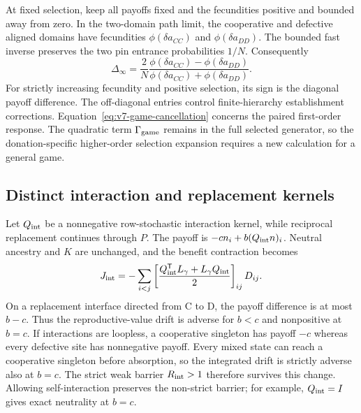 \documentclass[aps,pre,reprint,amsmath,amssymb,longbibliography]{revtex4-2}
\begin{document}
At fixed selection, keep all payoffs fixed and the fecundities
positive and bounded away from zero. In the two-domain path limit,
the cooperative and defective aligned domains have fecundities
$\phi(\delta a_{CC})$ and $\phi(\delta a_{DD})$. The bounded fast
inverse preserves the two pin entrance probabilities $1/N$.
Consequently
\begin{equation}
 \Delta_\infty=\frac2N
 \frac{\phi(\delta a_{CC})-\phi(\delta a_{DD})}
      {\phi(\delta a_{CC})+\phi(\delta a_{DD})}.
 \label{eq:v7-general-game-domain}
\end{equation}
For strictly increasing fecundity and positive selection, its sign
is the diagonal payoff difference. The off-diagonal entries control finite-hierarchy
establishment corrections. Equation~\eqref{eq:v7-game-cancellation}
concerns the paired first-order response. The quadratic term
$\Gamma_{\rm game}$ remains in the full selected generator, so the
donation-specific higher-order selection expansion requires a new
calculation for a general game.

\subsection{Distinct interaction and replacement kernels}
\label{app:v7-encounter-kernel}
Let $Q_{\rm int}$ be a nonnegative row-stochastic interaction
kernel, while reciprocal replacement continues through $P$.
The payoff is $-cn_i+b(Q_{\rm int}n)_i$. Neutral ancestry and $K$
are unchanged, and the benefit contraction becomes
\begin{equation}
 J_{\rm int}=-\sum_{i<j}
 \left[\frac{Q_{\rm int}^{\mathsf T}L_\gamma+
                   L_\gamma Q_{\rm int}}2\right]_{ij}D_{ij}.
 \label{eq:v7-separate-benefit}
\end{equation}
On a replacement interface directed from C to D, the payoff
difference is at most $b-c$. Thus the reproductive-value drift
is adverse for $b<c$ and nonpositive at $b=c$. If interactions
are loopless, a cooperative singleton has payoff $-c$ whereas
every defective site has nonnegative payoff. Every mixed state
can reach a cooperative singleton before absorption, so the
integrated drift is strictly adverse also at $b=c$. The strict
weak barrier $R_{\rm int}>1$ therefore survives this change.
Allowing self-interaction preserves the non-strict barrier; for
example, $Q_{\rm int}=I$ gives exact neutrality at $b=c$.
\end{document}

